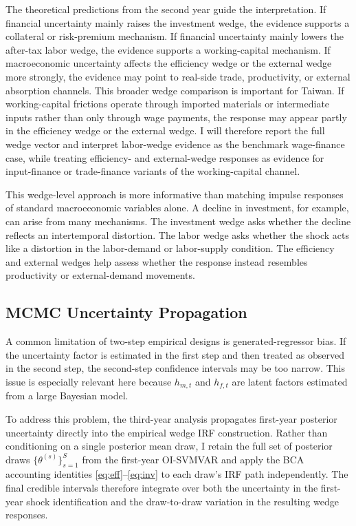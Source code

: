 \documentclass[12pt]{article}
\begin{document}
The theoretical predictions from the second year guide the interpretation. If financial uncertainty
mainly raises the investment wedge, the evidence supports a collateral or risk-premium mechanism.
If financial uncertainty mainly lowers the after-tax labor wedge, the evidence supports a
working-capital mechanism. If macroeconomic uncertainty affects the efficiency wedge or the
external wedge more strongly, the evidence may point to real-side trade, productivity, or external
absorption channels.
This broader wedge comparison is important for Taiwan. If working-capital frictions operate
through imported materials or intermediate inputs rather than only through wage payments, the
response may appear partly in the efficiency wedge or the external wedge. I will therefore report
the full wedge vector and interpret labor-wedge evidence as the benchmark wage-finance case,
while treating efficiency- and external-wedge responses as evidence for input-finance or
trade-finance variants of the working-capital channel.

This wedge-level approach is more informative than matching impulse responses of standard
macroeconomic variables alone. A decline in investment, for example, can arise from many
mechanisms. The investment wedge asks whether the decline reflects an intertemporal distortion.
The labor wedge asks whether the shock acts like a distortion in the labor-demand or labor-supply
condition. The efficiency and external wedges help assess whether the response instead resembles
productivity or external-demand movements.

\subsection{MCMC Uncertainty Propagation}

A common limitation of two-step empirical designs is generated-regressor bias. If the uncertainty
factor is estimated in the first step and then treated as observed in the second step, the second-step
confidence intervals may be too narrow. This issue is especially relevant here because
$h_{m,t}$ and $h_{f,t}$ are latent factors estimated from a large Bayesian model.

To address this problem, the third-year analysis propagates first-year posterior uncertainty
directly into the empirical wedge IRF construction. Rather than conditioning on a single
posterior mean draw, I retain the full set of posterior draws
$\{\theta^{(s)}\}_{s=1}^{S}$ from the first-year OI-SVMVAR and apply the BCA accounting
identities \eqref{eq:eff}--\eqref{eq:inv} to each draw's IRF path independently. The
final credible intervals therefore integrate over both the uncertainty in the first-year
shock identification and the draw-to-draw variation in the resulting wedge responses.
\end{document}

